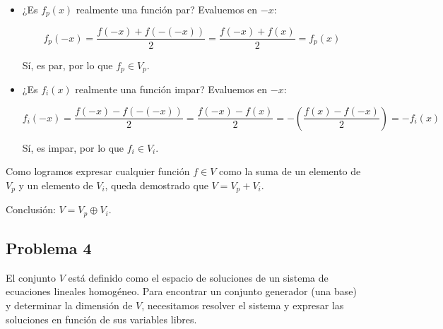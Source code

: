 \documentclass[11pt,spanish]{article}
\begin{document}
\begin{itemize}
\begin{itemize}
\begin{itemize}
¡Sí!

\item ¿Es $f_p(x)$ realmente una función par? Evaluemos en $-x$:

$$f_p(-x) = \frac{f(-x) + f(-(-x))}{2} = \frac{f(-x) + f(x)}{2} = f_p(x)$$

Sí, es par, por lo que $f_p \in V_p$.

\item ¿Es $f_i(x)$ realmente una función impar? Evaluemos en $-x$:

$$f_i(-x) = \frac{f(-x) - f(-(-x))}{2} = \frac{f(-x) - f(x)}{2} = -\left( \frac{f(x) - f(-x)}{2} \right) = -f_i(x)$$

Sí, es impar, por lo que $f_i \in V_i$.

\end{itemize}
\end{itemize}

Como logramos expresar cualquier función $f \in V$ como la suma de un elemento de $V_p$ y un elemento de $V_i$, queda demostrado que $V = V_p + V_i$.

Conclusión: $V = V_p \oplus V_i$.

\end{itemize}

\subsection*{Problema 4}

El conjunto $V$ está definido como el espacio de soluciones de un sistema de ecuaciones lineales homogéneo. Para encontrar un conjunto generador (una base) y determinar la dimensión de $V$, necesitamos resolver el sistema y expresar las soluciones en función de sus variables libres.
\end{document}
